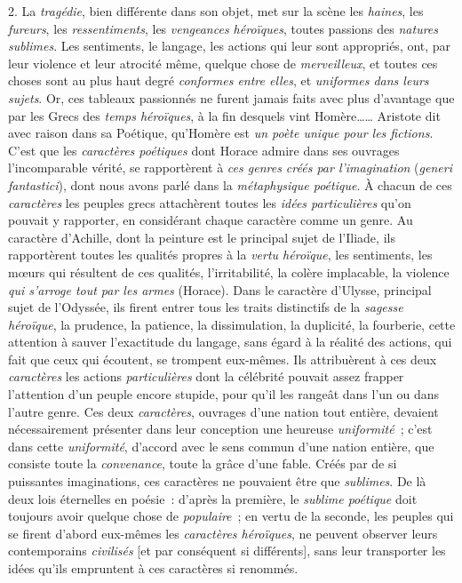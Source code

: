 \documentclass[french,twoside]{book} %
\newcommand\chapterclose{} %
\begin{document}
2. La {\itshape tragédie}, bien différente dans son objet, met sur la scène les {\itshape haines}, les {\itshape fureurs}, les {\itshape ressentiments},  les {\itshape vengeances héroïques}, toutes passions des {\itshape natures sublimes}. Les sentiments, le langage, les actions qui leur sont appropriés, ont, par leur violence et leur atrocité même, quelque chose de {\itshape merveilleux}, et toutes ces choses sont au plus haut degré {\itshape conformes entre elles}, et {\itshape uniformes dans leurs sujets}. Or, ces tableaux passionnés ne furent jamais faits avec plus d’avantage que par les Grecs des {\itshape temps héroïques}, à la fin desquels vint Homère…… Aristote dit avec raison dans sa Poétique, qu’Homère est {\itshape un poète unique pour les fictions}. C’est que les {\itshape caractères poétiques} dont Horace admire dans ses ouvrages l’incomparable vérité, se rapportèrent à {\itshape ces genres créés par l’imagination} ({\itshape generi fantastici}), dont nous avons parlé dans la {\itshape métaphysique poétique}. À chacun de ces {\itshape caractères} les peuples grecs attachèrent toutes les {\itshape idées particulières} qu’on pouvait y rapporter, en considérant chaque caractère comme un genre. Au caractère d’Achille, dont la peinture est le principal sujet de l’Iliade, ils rapportèrent toutes les qualités propres à la {\itshape vertu héroïque}, les sentiments, les mœurs qui résultent de ces qualités, l’irritabilité, la colère implacable, la violence {\itshape qui s’arroge tout par les armes} (Horace). Dans le caractère d’Ulysse, principal sujet de l’Odyssée, ils firent entrer tous les traits distinctifs de la {\itshape sagesse héroïque}, la prudence, la patience, la dissimulation, la duplicité, la fourberie, cette attention à sauver l’exactitude du langage, sans égard à la réalité des actions, qui fait que ceux qui écoutent,  se trompent eux-mêmes. Ils attribuèrent à ces deux {\itshape caractères} les actions {\itshape particulières} dont la célébrité pouvait assez frapper l’attention d’un peuple encore stupide, pour qu’il les rangeât dans l’un ou dans l’autre genre. Ces deux {\itshape caractères}, ouvrages d’une nation tout entière, devaient nécessairement présenter dans leur conception une heureuse {\itshape uniformité} ; c’est dans cette {\itshape uniformité}, d’accord avec le sens commun d’une nation entière, que consiste toute la {\itshape convenance}, toute la grâce d’une fable. Créés par de si puissantes imaginations, ces caractères ne pouvaient être que {\itshape sublimes}. De là deux lois éternelles en poésie : d’après la première, le {\itshape sublime poétique} doit toujours avoir quelque chose de {\itshape populaire} ; en vertu de la seconde, les peuples qui se firent d’abord eux-mêmes les {\itshape caractères héroïques}, ne peuvent observer leurs contemporains {\itshape civilisés} [et par conséquent si différents], sans leur transporter les idées qu’ils empruntent à ces caractères si renommés.
\chapterclose
\end{document}
